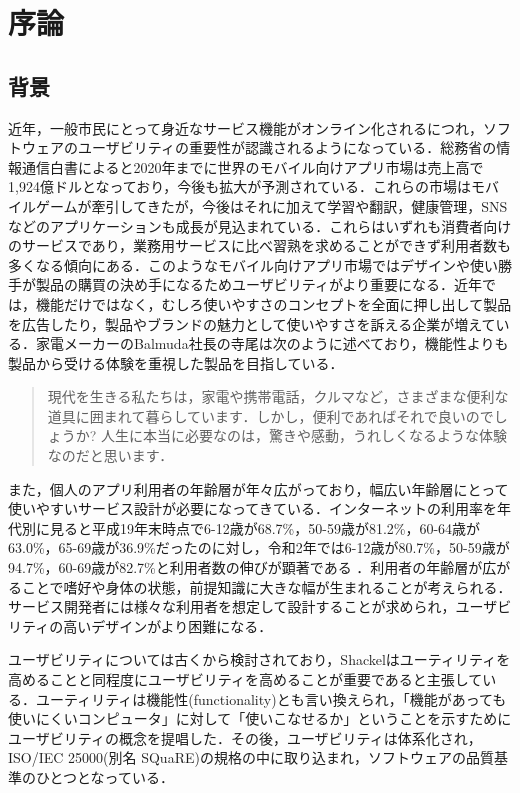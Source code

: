 \chapter{序論}
\label{chap:introduction}

\section{背景}

近年，一般市民にとって身近なサービス機能がオンライン化されるにつれ，ソフトウェアのユーザビリティの重要性が認識されるようになっている\cite{kurosu}．総務省の情報通信白書によると2020年までに世界のモバイル向けアプリ市場は売上高で1,924億ドルとなっており，今後も拡大が予測されている．これらの市場はモバイルゲームが牽引してきたが，今後はそれに加えて学習や翻訳，健康管理，SNSなどのアプリケーションも成長が見込まれている\cite{hakusyo}．これらはいずれも消費者向けのサービスであり，業務用サービスに比べ習熟を求めることができず利用者数も多くなる傾向にある．このようなモバイル向けアプリ市場ではデザインや使い勝手が製品の購買の決め手になるためユーザビリティがより重要になる．近年では，機能だけではなく，むしろ使いやすさのコンセプトを全面に押し出して製品を広告したり，製品やブランドの魅力として使いやすさを訴える企業が増えている\cite{tullis2014}．家電メーカーのBalmuda社長の寺尾は次のように述べており，機能性よりも製品から受ける体験を重視した製品を目指している．\begin{quotation}
  現代を生きる私たちは，家電や携帯電話，クルマなど，さまざまな便利な道具に囲まれて暮らしています．しかし，便利であればそれで良いのでしょうか? 人生に本当に必要なのは，驚きや感動，うれしくなるような体験なのだと思います\cite{terao}．
\end{quotation}

また，個人のアプリ利用者の年齢層が年々広がっており，幅広い年齢層にとって使いやすいサービス設計が必要になってきている．インターネットの利用率を年代別に見ると平成19年末時点で6-12歳が68.7\%，50-59歳が81.2\%，60-64歳が63.0\%，65-69歳が36.9\%だったのに対し，令和2年では6-12歳が80.7\%，50-59歳が94.7\%，60-69歳が82.7\%と利用者数の伸びが顕著である\cite{doukou1}\cite{doukou2} ．利用者の年齢層が広がることで嗜好や身体の状態，前提知識に大きな幅が生まれることが考えられる．サービス開発者には様々な利用者を想定して設計することが求められ，ユーザビリティの高いデザインがより困難になる．

ユーザビリティについては古くから検討されており，Shackel\cite{shackel1991human}はユーティリティを高めることと同程度にユーザビリティを高めることが重要であると主張している．ユーティリティは機能性(functionality)とも言い換えられ，「機能があっても使いにくいコンピュータ」に対して「使いこなせるか」ということを示すためにユーザビリティの概念を提唱した\cite{kurosu}．その後，ユーザビリティは体系化され，ISO/IEC 25000(別名 SQuaRE)の規格の中に取り込まれ，ソフトウェアの品質基準のひとつとなっている．


